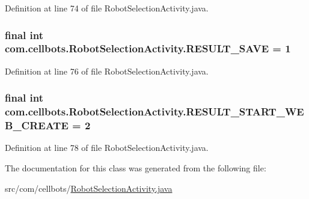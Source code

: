 Definition at line 74 of file Robot\-Selection\-Activity.\-java.

\hypertarget{classcom_1_1cellbots_1_1_robot_selection_activity_a58905ded45c5c3bffe846f08f7e0131d}{
\subsubsection[{R\-E\-S\-U\-L\-T\-\_\-\-S\-A\-V\-E}]{\setlength{\rightskip}{0pt plus 5cm}final int {\bf com.\-cellbots.\-Robot\-Selection\-Activity.\-R\-E\-S\-U\-L\-T\-\_\-\-S\-A\-V\-E} = 1}}\label{classcom_1_1cellbots_1_1_robot_selection_activity_a58905ded45c5c3bffe846f08f7e0131d}


Definition at line 76 of file Robot\-Selection\-Activity.\-java.

\hypertarget{classcom_1_1cellbots_1_1_robot_selection_activity_a048ac1c9abd537fcada0099a739bc591}{
\subsubsection[{R\-E\-S\-U\-L\-T\-\_\-\-S\-T\-A\-R\-T\-\_\-\-W\-E\-B\-\_\-\-C\-R\-E\-A\-T\-E}]{\setlength{\rightskip}{0pt plus 5cm}final int {\bf com.\-cellbots.\-Robot\-Selection\-Activity.\-R\-E\-S\-U\-L\-T\-\_\-\-S\-T\-A\-R\-T\-\_\-\-W\-E\-B\-\_\-\-C\-R\-E\-A\-T\-E} = 2}}\label{classcom_1_1cellbots_1_1_robot_selection_activity_a048ac1c9abd537fcada0099a739bc591}


Definition at line 78 of file Robot\-Selection\-Activity.\-java.



The documentation for this class was generated from the following file\-:\begin{DoxyCompactItemize}
\item 
src/com/cellbots/\hyperlink{_robot_selection_activity_8java}{Robot\-Selection\-Activity.\-java}\end{DoxyCompactItemize}
